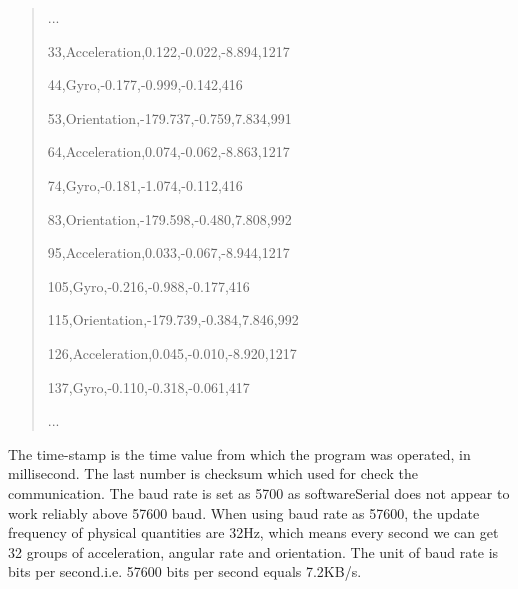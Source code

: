 \begin{quote}
\centering
...

33,Acceleration,0.122,-0.022,-8.894,1217

44,Gyro,-0.177,-0.999,-0.142,416

53,Orientation,-179.737,-0.759,7.834,991

64,Acceleration,0.074,-0.062,-8.863,1217

74,Gyro,-0.181,-1.074,-0.112,416

83,Orientation,-179.598,-0.480,7.808,992

95,Acceleration,0.033,-0.067,-8.944,1217

105,Gyro,-0.216,-0.988,-0.177,416

115,Orientation,-179.739,-0.384,7.846,992

126,Acceleration,0.045,-0.010,-8.920,1217

137,Gyro,-0.110,-0.318,-0.061,417

...
\end{quote}

The time-stamp is the time value from which the program was operated, in millisecond. The last number is checksum which used for check the communication.
The baud rate is set as 5700 as softwareSerial does not appear to work reliably above 57600 baud.\cite{ardusatsdk}
When using baud rate as 57600, the update frequency of physical quantities are 32Hz, which means every second we can get 32 groups of acceleration, angular rate and orientation. The unit of baud rate is bits per second.i.e. 57600 bits per second equals 7.2KB/s\cite{dong1994device}.

